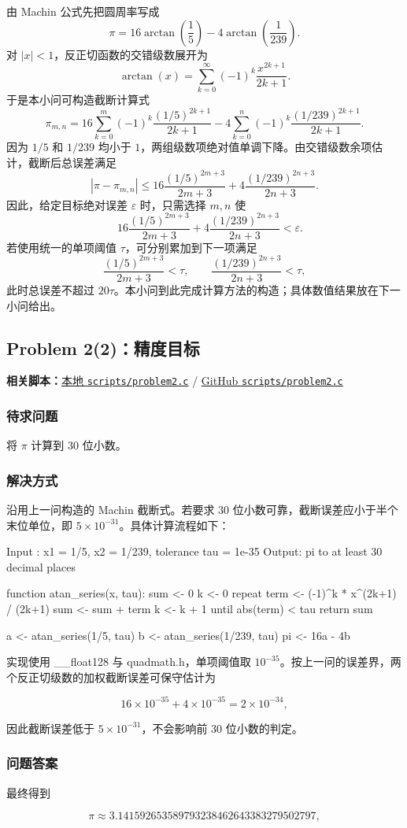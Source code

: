 \documentclass[12pt,a4paper,fontset=none]{ctexart}
\newcommand{\problem}[1]{\subsection{#1}}
\newcommand{\blocktitle}[1]{\subsubsection{#1}}
\newcommand{\codeinline}[1]{{\normalfont #1}}
\newcommand{\fileinline}[1]{{\urlstyle{same}\nolinkurl{#1}}}
\newcommand{\scriptpath}[1]{\fileinline{#1}}
\newcommand{\githubscriptsbase}{https://github.com/Void0312Aurora/computational-physics-homework-2026/blob/main/02/scripts}
\newcommand{\scriptlink}[1]{\noindent\textbf{相关脚本：}\href{../../../scripts/#1}{本地 \scriptpath{scripts/#1}} / \href{\githubscriptsbase/#1}{GitHub \scriptpath{scripts/#1}}\par\medskip}
\begin{document}
由 Machin 公式先把圆周率写成
\[
\pi=16\arctan\left(\frac15\right)-4\arctan\left(\frac{1}{239}\right).
\]
对 \(|x|<1\)，反正切函数的交错级数展开为
\[
\arctan(x)=\sum_{k=0}^{\infty}(-1)^k\frac{x^{2k+1}}{2k+1}.
\]
于是本小问可构造截断计算式
\[
\pi_{m,n}
=16\sum_{k=0}^{m}(-1)^k\frac{(1/5)^{2k+1}}{2k+1}
-4\sum_{k=0}^{n}(-1)^k\frac{(1/239)^{2k+1}}{2k+1}.
\]
因为 \(1/5\) 和 \(1/239\) 均小于 \(1\)，两组级数项绝对值单调下降。由交错级数余项估计，截断后总误差满足
\[
\left|\pi-\pi_{m,n}\right|
\le
16\frac{(1/5)^{2m+3}}{2m+3}
+4\frac{(1/239)^{2n+3}}{2n+3}.
\]
因此，给定目标绝对误差 \(\varepsilon\) 时，只需选择 \(m,n\) 使
\[
\quad
16\frac{(1/5)^{2m+3}}{2m+3}
+4\frac{(1/239)^{2n+3}}{2n+3}<\varepsilon.
\]
若使用统一的单项阈值 \(\tau\)，可分别累加到下一项满足
\[
\frac{(1/5)^{2m+3}}{2m+3}<\tau,\qquad
\frac{(1/239)^{2n+3}}{2n+3}<\tau,
\]
此时总误差不超过 \(20\tau\)。本小问到此完成计算方法的构造；具体数值结果放在下一小问给出。

\problem{Problem 2(2)：精度目标}

\scriptlink{problem2.c}

\blocktitle{待求问题}

将 \(\pi\) 计算到 30 位小数。

\blocktitle{解决方式}

沿用上一问构造的 Machin 截断式。若要求 30 位小数可靠，截断误差应小于半个末位单位，即 \(5\times10^{-31}\)。具体计算流程如下：

\begin{CodeBlock}
Input : x1 = 1/5, x2 = 1/239, tolerance tau = 1e-35
Output: pi to at least 30 decimal places

function atan_series(x, tau):
    sum <- 0
    k <- 0
    repeat
        term <- (-1)^k * x^(2k+1) / (2k+1)
        sum <- sum + term
        k <- k + 1
    until abs(term) < tau
    return sum

a <- atan_series(1/5, tau)
b <- atan_series(1/239, tau)
pi <- 16a - 4b
\end{CodeBlock}

实现使用 \codeinline{\_\_float128} 与 \codeinline{quadmath.h}，单项阈值取 \(10^{-35}\)。按上一问的误差界，两个反正切级数的加权截断误差可保守估计为

\[
16\times 10^{-35}+4\times 10^{-35}=2\times 10^{-34},
\]

因此截断误差低于 \(5\times10^{-31}\)，不会影响前 30 位小数的判定。

\blocktitle{问题答案}

最终得到

\[
\pi \approx 3.141592653589793238462643383279502797,
\]
\end{document}
